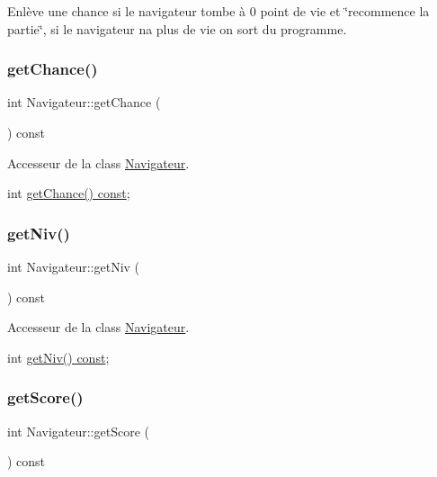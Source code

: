 Enlève une chance si le navigateur tombe à 0 point de vie et \char`\"{}recommence la partie\char`\"{}, si le navigateur n\textquotesingle{}a plus de vie on sort du programme. 

\mbox{\label{class_navigateur_a02507fc847204a3650378b76072b3e30}} 
\subsubsection{\texorpdfstring{get\+Chance()}{getChance()}}
{\footnotesize\ttfamily int Navigateur\+::get\+Chance (\begin{DoxyParamCaption}{ }\end{DoxyParamCaption}) const}



Accesseur de la class \hyperlink{class_navigateur}{Navigateur}. 

int \hyperlink{class_navigateur_a02507fc847204a3650378b76072b3e30}{get\+Chance() const}; \mbox{\label{class_navigateur_a904f67b146dbb561d72cc38ead3d7318}} 
\subsubsection{\texorpdfstring{get\+Niv()}{getNiv()}}
{\footnotesize\ttfamily int Navigateur\+::get\+Niv (\begin{DoxyParamCaption}{ }\end{DoxyParamCaption}) const}



Accesseur de la class \hyperlink{class_navigateur}{Navigateur}. 

int \hyperlink{class_navigateur_a904f67b146dbb561d72cc38ead3d7318}{get\+Niv() const}; \mbox{\label{class_navigateur_a52606df1f11308074aa64a81cc25e467}} 
\subsubsection{\texorpdfstring{get\+Score()}{getScore()}}
{\footnotesize\ttfamily int Navigateur\+::get\+Score (\begin{DoxyParamCaption}{ }\end{DoxyParamCaption}) const}



